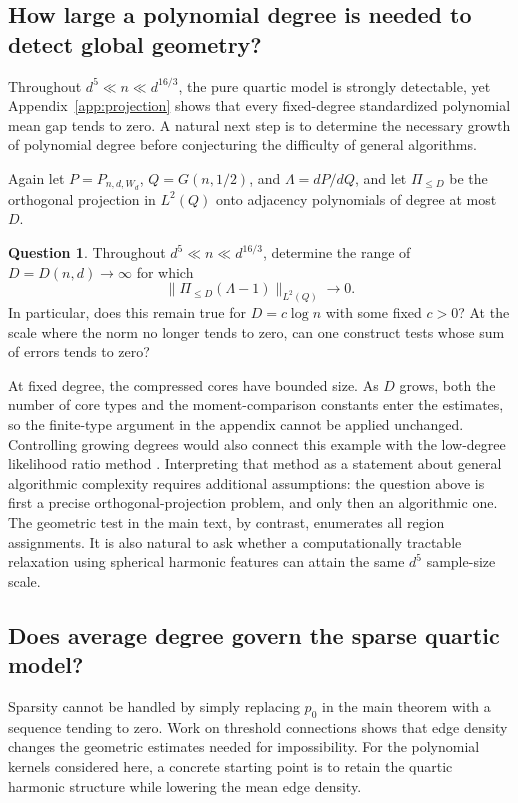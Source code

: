 \documentclass[11pt,reqno]{amsart}
\numberwithin{equation}{section}
\theoremstyle{definition}
\theoremstyle{remark}
\theoremstyle{definition}
\newtheorem{question}[theorem]{Question}
\begin{document}
\subsection{How large a polynomial degree is needed to detect global geometry?}
Throughout $d^5\ll n\ll d^{16/3}$, the pure quartic model is strongly detectable,
yet Appendix~\ref{app:projection} shows that every fixed-degree standardized polynomial mean gap tends to zero.
A natural next step is to determine the necessary growth of polynomial degree before conjecturing the difficulty of general algorithms.

Again let $P=P_{n,d,W_d}$, $Q=G(n,1/2)$, and $\Lambda=dP/dQ$,
and let $\Pi_{\le D}$ be the orthogonal projection in $L^2(Q)$ onto adjacency polynomials of degree at most $D$.

\begin{question}\label{q:degree}
Throughout $d^5\ll n\ll d^{16/3}$, determine the range of $D=D(n,d)\to\infty$ for which
\[
 \|\Pi_{\le D}(\Lambda-1)\|_{L^2(Q)}\longrightarrow0.
\]
In particular, does this remain true for $D=c\log n$ with some fixed $c>0$?
At the scale where the norm no longer tends to zero, can one construct tests whose sum of errors tends to zero?
\end{question}

At fixed degree, the compressed cores have bounded size. As $D$ grows, both the number of core types and the moment-comparison constants
enter the estimates, so the finite-type argument in the appendix cannot be applied unchanged.
Controlling growing degrees would also connect this example with the low-degree likelihood ratio method \cite{KWB}.
Interpreting that method as a statement about general algorithmic complexity requires additional assumptions:
the question above is first a precise orthogonal-projection problem, and only then an algorithmic one.
The geometric test in the main text, by contrast, enumerates all region assignments.
It is also natural to ask whether a computationally tractable relaxation using spherical harmonic features can attain the same $d^5$ sample-size scale.

\subsection{Does average degree govern the sparse quartic model?}
Sparsity cannot be handled by simply replacing $p_0$ in the main theorem with a sequence tending to zero.
Work on threshold connections \cite{LMSY,DMSWX} shows that edge density changes the geometric estimates needed for impossibility.
For the polynomial kernels considered here, a concrete starting point is to retain the quartic harmonic structure while lowering the mean edge density.
\end{document}
